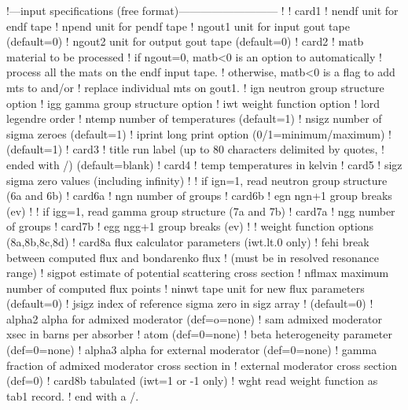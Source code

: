 \small
\begin{ccode}

   !---input specifications (free format)---------------------------
   !
   ! card1
   !    nendf   unit for endf tape
   !    npend   unit for pendf tape
   !    ngout1  unit for input gout tape (default=0)
   !    ngout2  unit for output gout tape (default=0)
   ! card2
   !    matb    material to be processed
   !             if ngout=0, matb<0 is an option to automatically
   !              process all the mats on the endf input tape.
   !             otherwise, matb<0 is a flag to add mts to and/or
   !              replace individual mts on gout1.
   !    ign     neutron group structure option
   !    igg     gamma group structure option
   !    iwt     weight function option
   !    lord    legendre order
   !    ntemp   number of temperatures (default=1)
   !    nsigz   number of sigma zeroes (default=1)
   !    iprint  long print option (0/1=minimum/maximum)
   !            (default=1)
   ! card3
   !    title   run label (up to 80 characters delimited by quotes,
   !            ended with /)  (default=blank)
   ! card4
   !    temp    temperatures in kelvin
   ! card5
   !    sigz    sigma zero values (including infinity)
   !
   !          if ign=1, read neutron group structure (6a and 6b)
   ! card6a
   !    ngn     number of groups
   ! card6b
   !    egn     ngn+1 group breaks (ev)
   !
   !          if igg=1, read gamma group structure (7a and 7b)
   ! card7a
   !    ngg     number of groups
   ! card7b
   !    egg     ngg+1 group breaks (ev)
   !
   !          weight function options (8a,8b,8c,8d)
   ! card8a     flux calculator parameters (iwt.lt.0 only)
   !    fehi    break between computed flux and bondarenko flux
   !            (must be in resolved resonance range)
   !    sigpot  estimate of potential scattering cross section
   !    nflmax  maximum number of computed flux points
   !    ninwt   tape unit for new flux parameters (default=0)
   !    jsigz   index of reference sigma zero in sigz array
   !            (default=0)
   !    alpha2   alpha for admixed moderator (def=o=none)
   !    sam      admixed moderator xsec in barns per absorber
   !             atom (def=0=none)
   !    beta     heterogeneity parameter (def=0=none)
   !    alpha3   alpha for external moderator (def=0=none)
   !    gamma    fraction of admixed moderator cross section in
   !              external moderator cross section (def=0)
   ! card8b     tabulated (iwt=1 or -1 only)
   !    wght    read weight function as tab1 record.
   !            end with a /.

\end{ccode}
